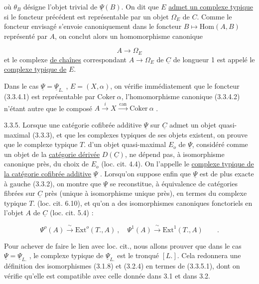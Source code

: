  où $\theta_B$ désigne l'objet trivial de $\underline{\Psi}(B)$. On dit que $E$ \underline{admet un complexe typique} si le foncteur précédent est représentable par un objet $\Omega_E$ de $C$. Comme le foncteur envisagé s'envoie canoniquement dans le foncteur $B \longmapsto \mathrm{Hom}(A,B)$ représenté par $A$, on conclut alors un homomorphisme canonique

\begin{equation}\tag{3.3.4.2}
A \longrightarrow \Omega_E
\end{equation}
et le complexe \underline{de chaînes} correspondant $A \longrightarrow \Omega_E$ de $\underline{C}$ de longueur 1 est appelé le \underline{complexe typique de} $E$.

Dans le cas $\underline{\Psi} = \underline{\Psi}_{L.}$ , $E = (X,\alpha)$, on vérifie immédiatement que le foncteur (3.3.4.1) est représentable par $\mathrm{Coker}\ \alpha$, l'homomorphisme canonique (3.3.4.2) n'étant autre que le composé $A \xrightarrow{\ i\ } X \xrightarrow{\ \mathrm{can}\ } \mathrm{Coker}\ \alpha$ .

3.3.5. Lorsque une catégorie cofibrée additive $\underline{\Psi}$ sur $\underline{C}$ admet un objet quasi-maximal (3.3.3), et que les complexes typiques de ses objets existent, on prouve que le complexe typique $T.$ d'un objet quasi-maximal $E_o$ de $\underline{\Psi}$, considéré comme un objet de la \underline{catégorie dérivée} $D(\underline{C})$, ne dépend pas, à isomorphisme canonique près, du choix de $E_o$ (loc. cit. 4.4). On l'appelle le \underline{complexe typique de la catégorie cofibrée additive} $\underline{\Psi}$ . Lorsqu'on suppose enfin que $\underline{\Psi}$ est de plus exacte à gauche (3.3.2), on montre que $\underline{\Psi}$ se reconstitue, à équivalence de catégories fibrées sur $\underline{C}$ près (unique à isomorphisme unique près), en termes du complexe typique $T.$ (loc. cit. 6.10), et qu'on a des isomorphismes canoniques fonctoriels en l'objet $A$ de $\underline{C}$ (loc. cit. 5.4) :

\begin{equation}\tag{3.3.5.1}
\Psi^o(A) \xrightarrow{\ \sim\ } \mathrm{Ext}^o(T.,A) \ , \quad \Psi^1(A) \xrightarrow{\ \sim\ } \mathrm{Ext}^1(T.,A) \qquad .
\end{equation}


Pour achever de faire le lien avec loc. cit., nous allons prouver que dans le cas $\underline{\Psi} = \underline{\Psi}_{L.}$ , le complexe typique de $\underline{\Psi}_{L.}$ est le tronqué $[L.]$. Cela redonnera une définition des isomorphismes (3.1.8) et (3.2.4) en termes de (3.3.5.1), dont on vérifie qu'elle est compatible avec celle donnée dans 3.1 et dans 3.2.

